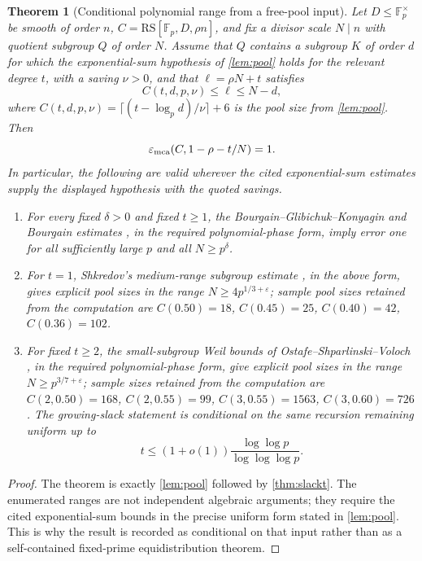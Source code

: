 \documentclass[11pt]{article}
\newtheorem{theorem}{Theorem}[section]
\theoremstyle{definition}
\newcommand{\F}{\mathbb F}
\newcommand{\eps}{\varepsilon}
\newcommand{\RS}{\mathrm{RS}}
\newcommand{\emca}{\eps_{\rm mca}}
\begin{document}
\begin{theorem}[Conditional polynomial range from a free-pool input]\label{thm:ladder}
Let $D\le\F_p^\times$ be smooth of order $n$, $C=\RS[\F_p,D,\rho n]$, and fix a divisor scale $N\mid n$ with quotient subgroup $Q$ of order $N$.  Assume that $Q$ contains a subgroup $K$ of order $d$ for which the exponential-sum hypothesis of \cref{lem:pool} holds for the relevant degree $t$, with a saving $\nu>0$, and that $\ell=\rho N+t$ satisfies
\[
        C(t,d,p,\nu)\le \ell\le N-d,
\]
where $C(t,d,p,\nu)=\lceil(t-\log_p d)/\nu\rceil+6$ is the pool size from \cref{lem:pool}.  Then
\[
        \emca(C,1-\rho-t/N)=1 .
\]
In particular, the following are valid wherever the cited exponential-sum estimates supply the displayed hypothesis with the quoted savings.
\begin{enumerate}[label=(\roman*),leftmargin=2.2em]
\item For every fixed $\delta>0$ and fixed $t\ge1$, the Bourgain--Glibichuk--Konyagin and Bourgain estimates \cite{BGK06,Bourgain05}, in the required polynomial-phase form, imply error one for all sufficiently large $p$ and all $N\ge p^\delta$.
\item For $t=1$, Shkredov's medium-range subgroup estimate \cite{Shk14}, in the above form, gives explicit pool sizes in the range $N\ge4p^{1/3+\eps}$; sample pool sizes retained from the computation are $C(0.50)=18$, $C(0.45)=25$, $C(0.40)=42$, $C(0.36)=102$.
\item For fixed $t\ge2$, the small-subgroup Weil bounds of Ostafe--Shparlinski--Voloch \cite{OSV24}, in the required polynomial-phase form, give explicit pool sizes in the range $N\ge p^{3/7+\eps}$; sample sizes retained from the computation are $C(2,0.50)=168$, $C(2,0.55)=99$, $C(3,0.55)=1563$, $C(3,0.60)=726$.  The growing-slack statement is conditional on the same recursion remaining uniform up to
\[
        t\le(1+o(1))\frac{\log\log p}{\log\log\log p}.
\]
\end{enumerate}
\end{theorem}

\begin{proof}
The theorem is exactly \cref{lem:pool} followed by \cref{thm:slackt}.  The enumerated ranges are not independent algebraic arguments; they require the cited exponential-sum bounds in the precise uniform form stated in \cref{lem:pool}.  This is why the result is recorded as conditional on that input rather than as a self-contained fixed-prime equidistribution theorem.
\end{proof}
\end{document}
